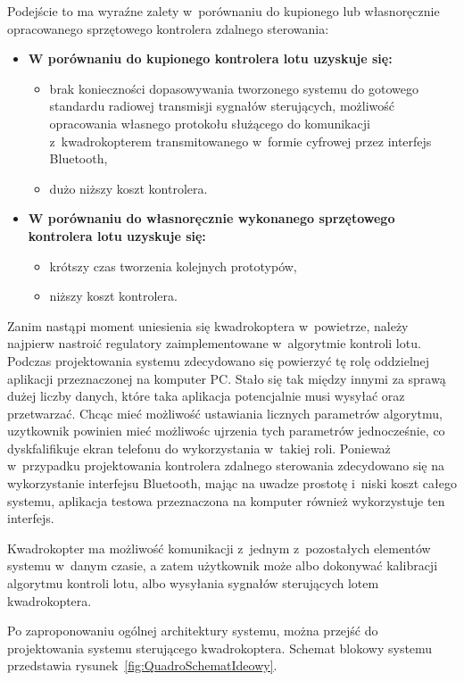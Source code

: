 Podejście to ma wyraźne zalety w~porównaniu do kupionego lub własnoręcznie opracowanego sprzętowego kontrolera zdalnego sterowania:

\begin{itemize}
	\item \textbf{W porównaniu do kupionego kontrolera lotu uzyskuje się:}
		\begin{itemize}
			\item brak konieczności dopasowywania tworzonego systemu do gotowego standardu radiowej transmisji sygnałów sterujących, możliwość opracowania własnego protokołu służącego do komunikacji z~kwadrokopterem transmitowanego w~formie cyfrowej przez interfejs Bluetooth,
			\item dużo niższy koszt kontrolera.
		\end{itemize}
	\item \textbf{W porównaniu do własnoręcznie wykonanego sprzętowego kontrolera lotu uzyskuje się:}
		\begin{itemize}
			\item krótszy czas tworzenia kolejnych prototypów,
			\item niższy koszt kontrolera.
		\end{itemize}
\end{itemize}

Zanim nastąpi moment uniesienia się kwadrokoptera w~powietrze, należy najpierw nastroić regulatory zaimplementowane w~algorytmie kontroli lotu. Podczas projektowania systemu zdecydowano się powierzyć tę rolę oddzielnej aplikacji przeznaczonej na komputer PC. Stało się tak między innymi za sprawą dużej liczby danych, które taka aplikacja potencjalnie musi wysyłać oraz przetwarzać. Chcąc mieć możliwość ustawiania licznych parametrów algorytmu, uzytkownik powinien mieć możliwośc ujrzenia tych parametrów jednocześnie, co dyskfalifikuje ekran telefonu do wykorzystania w~takiej roli. Ponieważ w~przypadku projektowania kontrolera zdalnego sterowania zdecydowano się na wykorzystanie interfejsu Bluetooth, mając na uwadze prostotę i~niski koszt całego systemu, aplikacja testowa przeznaczona na komputer również wykorzystuje ten interfejs.

Kwadrokopter ma możliwość komunikacji z~jednym z~pozostałych elementów systemu w~danym czasie, a zatem użytkownik może albo dokonywać kalibracji algorytmu kontroli lotu, albo wysyłania sygnałów sterujących lotem kwadrokoptera.

Po zaproponowaniu ogólnej architektury systemu, można przejść do projektowania systemu sterującego kwadrokoptera. Schemat blokowy systemu przedstawia rysunek~\ref{fig:QuadroSchematIdeowy}.

